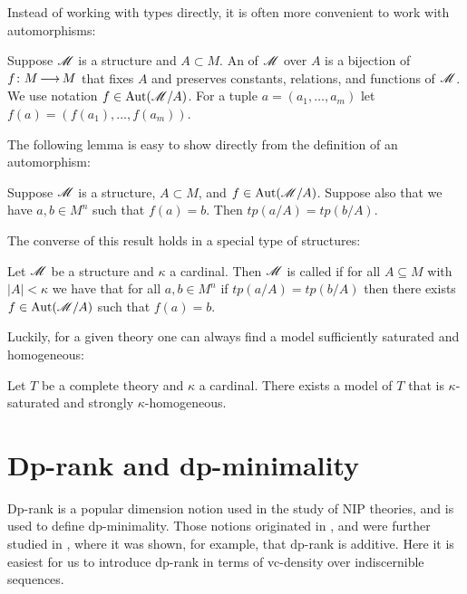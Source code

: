 Instead of working with types directly, it is often more convenient to work with automorphisms:
\begin{Definition}
  Suppose $\mathscr M$ is a structure and $A \subset M$.
  An  of $\mathscr M$ over $A$ is a bijection of $f \colon M \operatorname{\longrightarrow} M$
  that fixes $A$ and preserves constants, relations, and functions of $\mathscr M$.
  We use notation $f \in \operatorname{Aut}(\mathscr M/A)$.
  For a tuple $a = (a_1, \ldots, a_m)$ let $f(a) = (f(a_1), \ldots, f(a_m))$.
\end{Definition}

The following lemma is easy to show directly from the definition of an automorphism:
\begin{Lemma}
  Suppose $\mathscr M$ is a structure, $A \subset M$, and $f \in \operatorname{Aut}(\mathscr M/A)$.
  Suppose also that we have $a,b \in M^n$ such that $f(a) = b$.
  Then $tp(a/A) = tp(b/A)$.
\end{Lemma}

The converse of this result holds in a special type of structures:
\begin{Definition}
  Let $\mathscr M$ be a structure and $\kappa$ a cardinal.
  Then $\mathscr M$ is called  if for all $A \subseteq M$ with $|A| < \kappa$
  we have that for all $a, b \in M^n$ if $tp(a/A) = tp(b/A)$ then
  there exists $f \in \operatorname{Aut}(\mathscr M/A)$ such that $f(a) = b$.
\end{Definition}

Luckily, for a given theory one can always find a model sufficiently saturated and homogeneous:
\begin{Lemma} 
  Let $T$ be a complete theory and $\kappa$ a cardinal.
  There exists a model of $T$ that is $\kappa$-saturated and strongly $\kappa$-homogeneous.
\end{Lemma}




\section{Dp-rank and dp-minimality}

Dp-rank is a popular dimension notion used in the study of NIP theories, and is used to define dp-minimality.
Those notions originated in \cite{shelah_dp}, and were further studied in \cite{dp_add},
where it was shown, for example, that dp-rank is additive.
Here it is easiest for us to introduce dp-rank in terms of vc-density over indiscernible sequences.

